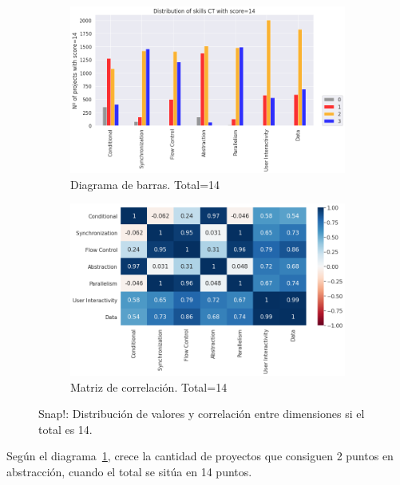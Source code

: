 \documentclass[a4paper, 12pt]{book}
\begin{document}
\begin{figure}[H]
    \centering
    \begin{subfigure}[h]{.49\textwidth} 
        \includegraphics[width=\textwidth]{img/distribucion_14_Snap}
        \caption{Diagrama de barras. Total=14}
        \label{fig:total14_Snap}
    \end{subfigure}       
    \begin{subfigure}[h]{.49\textwidth} 
        \includegraphics[width=\textwidth]{img/corr_14_Snap}
        \caption{Matriz de correlación. Total=14}
        \label{fig:corr14_Snap}
    \end{subfigure}
    \caption{Snap!: Distribución de valores y correlación entre dimensiones si el total es 14.}
\end{figure}

Según el diagrama~\ref{fig:total14_Snap}, crece la cantidad de proyectos que consiguen 2 puntos en abstracción, cuando el total se sitúa en 14 puntos.
\end{document}
